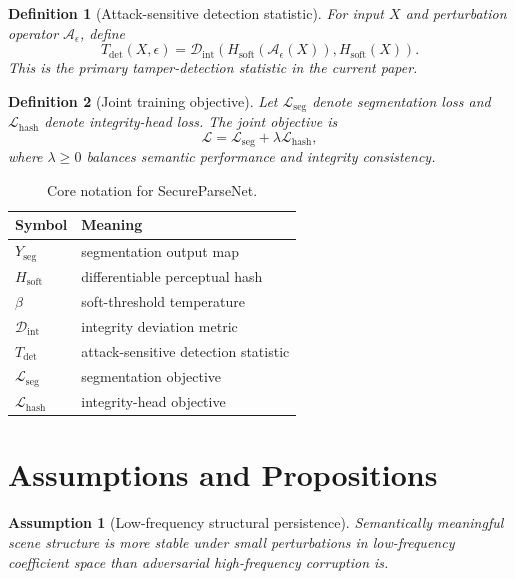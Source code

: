 \documentclass[11pt]{article}
\newtheorem{definition}{Definition}
\newtheorem{assumption}{Assumption}
\begin{document}
\begin{definition}[Attack-sensitive detection statistic]
For input $X$ and perturbation operator $\mathcal{A}_\epsilon$, define
\[
T_{\mathrm{det}}(X,\epsilon)=\mathcal{D}_{\mathrm{int}}\!\left(H_{\mathrm{soft}}(\mathcal{A}_\epsilon(X)),H_{\mathrm{soft}}(X)\right).
\]
This is the primary tamper-detection statistic in the current paper.
\end{definition}

\begin{definition}[Joint training objective]
Let $\mathcal{L}_{\mathrm{seg}}$ denote segmentation loss and $\mathcal{L}_{\mathrm{hash}}$ denote integrity-head loss. The joint objective is
\[
\mathcal{L}=\mathcal{L}_{\mathrm{seg}}+\lambda \mathcal{L}_{\mathrm{hash}},
\]
where $\lambda\ge 0$ balances semantic performance and integrity consistency.
\end{definition}

\begin{table}[t]
\centering
\small
\caption{Core notation for SecureParseNet.}
\label{tab:spn-notation}
\begin{tabular}{ll}
\toprule
Symbol & Meaning \\
\midrule
$Y_{\mathrm{seg}}$ & segmentation output map \\
$H_{\mathrm{soft}}$ & differentiable perceptual hash \\
$\beta$ & soft-threshold temperature \\
$\mathcal{D}_{\mathrm{int}}$ & integrity deviation metric \\
$T_{\mathrm{det}}$ & attack-sensitive detection statistic \\
$\mathcal{L}_{\mathrm{seg}}$ & segmentation objective \\
$\mathcal{L}_{\mathrm{hash}}$ & integrity-head objective \\
\bottomrule
\end{tabular}
\end{table}

\section{Assumptions and Propositions}
\begin{assumption}[Low-frequency structural persistence]
Semantically meaningful scene structure is more stable under small perturbations in low-frequency coefficient space than adversarial high-frequency corruption is.
\end{assumption}
\end{document}
